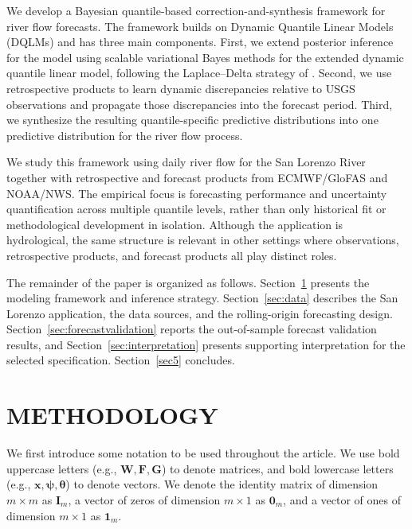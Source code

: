 \documentclass[APA,STIX1COL]{WileyNJD-v2}
\begin{document}
We develop a Bayesian quantile-based correction-and-synthesis framework for river flow forecasts. The framework builds on Dynamic Quantile Linear Models (DQLMs) \citep{goncalves, gourieroux2008dqlm, barata2021_flex_quantile} and has three main components. First, we extend posterior inference for the model using scalable variational Bayes methods for the extended dynamic quantile linear model, following the Laplace--Delta strategy of \citet{wang2013nonconjugatevb}. Second, we use retrospective products to learn dynamic discrepancies relative to USGS observations and propagate those discrepancies into the forecast period. Third, we synthesize the resulting quantile-specific predictive distributions into one predictive distribution for the river flow process.

We study this framework using daily river flow for the San Lorenzo River together with retrospective and forecast products from ECMWF/GloFAS and NOAA/NWS. The empirical focus is forecasting performance and uncertainty quantification across multiple quantile levels, rather than only historical fit or methodological development in isolation. Although the application is hydrological, the same structure is relevant in other settings where observations, retrospective products, and forecast products all play distinct roles.

The remainder of the paper is organized as follows. Section~\ref{sec:methodology} presents the modeling framework and inference strategy. Section~\ref{sec:data} describes the San Lorenzo application, the data sources, and the rolling-origin forecasting design. Section~\ref{sec:forecastvalidation} reports the out-of-sample forecast validation results, and Section~\ref{sec:interpretation} presents supporting interpretation for the selected specification. Section~\ref{sec5} concludes.

\section{METHODOLOGY}
\label{sec:methodology}

We first introduce some notation to be used throughout the article. We use bold uppercase letters (e.g., $\mathbf{W}, \mathbf{F}, \mathbf{G}$) to denote matrices, and bold lowercase letters (e.g., $\mathbf{x}, \mathbf{\psi}, \mathbf{\theta}$) to denote vectors. We denote the identity matrix of dimension $m \times m$ as $\mathbf{I}_m$, a vector of zeros of dimension $m \times 1$ as $\mathbf{0}_m$, and a vector of ones of dimension $m \times 1$ as $\mathbf{1}_m$.
\end{document}

